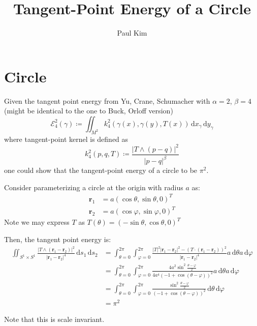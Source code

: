 \documentclass[a4paper]{article}
\title{Tangent-Point Energy of a Circle}
\author{Paul Kim}
\newcommand{\dx}{\, \text{d} x}
\newcommand{\dy}{\, \text{d} y}
\newcommand{\ds}{\, \text{d} s}
\newcommand{\dt}{\, \text{d} \theta}
\newcommand{\dphi}{\, \text{d} \varphi}
\newcommand{\rb}{\mathbf{r}}
\begin{document}
\maketitle

\section{Circle}
Given the tangent point energy from Yu, Crane, Schumacher with $\alpha = 2$, $\beta = 4$
(might be identical to the one to Buck, Orloff version)
\begin{equation}
    \mathcal{E}_{4}^2 \left( \gamma \right) \coloneqq \iint_{M^2} k_{4}^2 \left( \gamma (x), \gamma (y), T(x) \right) \dx_{\gamma} \dy_{\gamma}
    \label{equ: Energy}
\end{equation}
where tangent-point kernel is defined as
\begin{equation}
    k_{4}^2 (p, q, T) \coloneqq \frac{|T \wedge \left( p - q \right)|^2}{|p-q|^\beta}
\end{equation}
one could show that the tangent-point energy of a circle to be $\pi^2$.

Consider parameterizing a circle at the origin with radius $a$ as:
\begin{align}
    \rb_1 &= a \left( \cos \theta, \sin \theta, 0 \right) ^ T \\
    \rb_2 &= a \left( \cos \varphi, \sin \varphi, 0 \right) ^ T
\end{align}
Note we may express $T$ as $T\left( \theta \right) = \left( - \sin \theta, \cos \theta, 0 \right) ^ T$

Then, the tangent point energy is:
\begin{align}
    \iint_{S^1 \times S^1} \frac{|T \wedge \left( \rb_1 - \rb_2 \right)|^2}{|\rb_1 - \rb_2|^4} \ds_1 \ds_2
    &= \int_{\theta = 0}^{2 \pi} \int_{\varphi = 0}^{2 \pi} \frac{|T|^2 |\rb_1 - \rb_2|^2 - \left( T \cdot \left( \rb_1 - \rb_2 \right) \right)^2}{|\rb_1 - \rb_2|^4} a \dt a \dphi \\
    &= \int_{\theta = 0}^{2 \pi} \int_{\varphi = 0}^{2 \pi} \frac{4 a^2 \sin^2 \frac{\theta - \varphi}{2}}{4 a^4 \left( -1 + \cos \left( \theta - \varphi \right) \right)^2} a \dt a \dphi \\
    &= \int_{\theta = 0}^{2 \pi} \int_{\varphi = 0}^{2 \pi} \frac{\sin^2 \frac{\theta - \varphi}{2}}{\left( -1 + \cos \left( \theta - \varphi \right) \right)^2} \dt \dphi \\
    &= \pi^2
\end{align}

Note that this is scale invariant.
\end{document}
